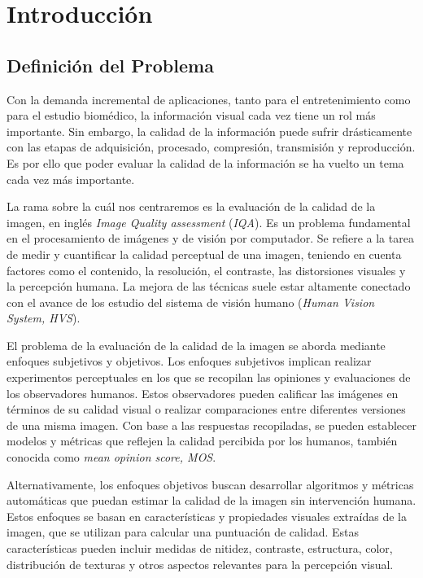 \chapter{Introducción}
\section{Definición del Problema}   
Con la demanda incremental de aplicaciones, tanto para el entretenimiento 
como para el estudio biomédico, la información visual cada vez tiene un rol 
más importante. Sin embargo, la calidad de la información puede sufrir drásticamente
con las etapas de adquisición, procesado, compresión, transmisión y reproducción.
Es por ello que poder evaluar la calidad de la información se ha vuelto un 
tema cada vez más importante\cite{VisualMedicalQualityBook}.

La rama sobre la cuál nos centraremos es la evaluación de la calidad de la imagen,
en inglés \emph{Image Quality assessment} (\emph{IQA}).
Es un problema fundamental en el procesamiento de imágenes y de visión 
por computador. Se refiere a la tarea de medir y cuantificar 
la calidad perceptual de una imagen, 
teniendo en cuenta factores como el contenido, la resolución, 
el contraste, las distorsiones visuales y la percepción humana. 
La mejora de las técnicas suele estar altamente conectado con el avance 
de los estudio del sistema de visión humano (\emph{Human Vision System, HVS})\cite{Wang2006ModernIQ}.
 
El problema de la evaluación de la calidad de la imagen se aborda mediante enfoques 
subjetivos y objetivos. Los enfoques subjetivos implican realizar experimentos 
perceptuales en los que se recopilan las opiniones y evaluaciones de los observadores 
humanos. Estos observadores pueden calificar las imágenes en términos de su 
calidad visual o realizar comparaciones entre diferentes versiones de una misma imagen. 
Con base a las respuestas recopiladas, se pueden establecer modelos y 
métricas que reflejen la calidad percibida por los humanos, también conocida
como \emph{mean opinion score, MOS}\footnotemark[1].

Alternativamente, los enfoques objetivos buscan desarrollar algoritmos y métricas 
automáticas que puedan estimar la calidad de la imagen sin intervención humana. 
Estos enfoques se basan en características y propiedades visuales extraídas de la 
imagen, que se utilizan para calcular una puntuación de calidad. Estas características 
pueden incluir medidas de nitidez, contraste, estructura, color, distribución de 
texturas y otros aspectos relevantes para la percepción visual.
 
